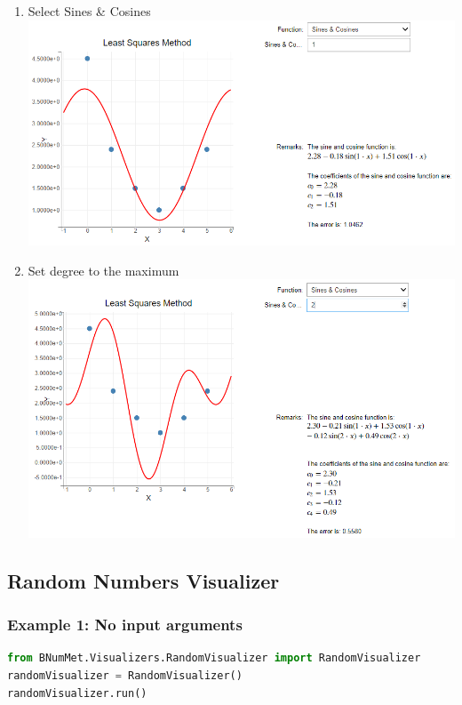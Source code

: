 {\begin{enumerate}
    \item Select Sines \& Cosines\\
    \includegraphics[scale=0.6]{Include/Images/Thesis/Documentation/Visualizers/LeastSquares/Example 3/Example 3 - 00 - Trigonometry.png}
    \item Set degree to the maximum\\
    \includegraphics[scale=0.6]{Include/Images/Thesis/Documentation/Visualizers/LeastSquares/Example 3/Example 3 - 01 - Trigonometry Degree 2.png}
\end{enumerate}
}

\subsection{Random Numbers Visualizer}
\subsubsection{Example 1: No input arguments}
\begin{lstlisting}[language=Python]
from BNumMet.Visualizers.RandomVisualizer import RandomVisualizer
randomVisualizer = RandomVisualizer()
randomVisualizer.run()
\end{lstlisting}

